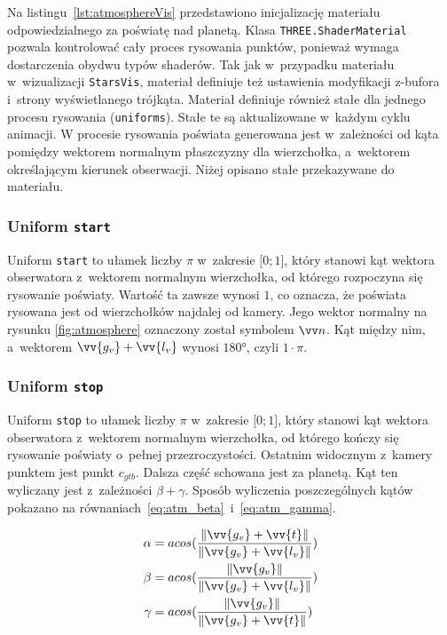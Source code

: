 Na listingu~\ref{lst:atmosphereVis} przedstawiono inicjalizację materiału odpowiedzialnego za poświatę nad planetą. Klasa \texttt{THREE.ShaderMaterial} pozwala kontrolować cały proces rysowania punktów, ponieważ wymaga dostarczenia obydwu typów shaderów. Tak jak w~przypadku materiału w~wizualizacji \texttt{StarsVis}, materiał definiuje też ustawienia modyfikacji z-bufora i~strony wyświetlanego trójkąta. Materiał definiuje również stałe dla jednego procesu rysowania (\texttt{uniforms}). Stałe te są aktualizowane w~każdym cyklu animacji. 
W procesie rysowania poświata generowana jest w~zależności od kąta pomiędzy wektorem normalnym płaszczyzny dla wierzchołka, a~wektorem określającym kierunek obserwacji. Niżej opisano stałe przekazywane do materiału.

\subsubsection{Uniform \texttt{start}}
Uniform \texttt{start} to ułamek liczby $\pi$ w~zakresie $\lbrack0; 1\rbrack$, który stanowi kąt wektora obserwatora z~wektorem normalnym wierzchołka, od którego rozpoczyna się rysowanie poświaty. Wartość ta zawsze wynosi $1$, co oznacza, że poświata rysowana jest od wierzchołków najdalej od kamery. Jego wektor normalny na rysunku \ref{fig:atmosphere} oznaczony został symbolem $\vv n$. Kąt między nim, a~wektorem $\vv{g_v} + \vv{l_v}$ wynosi $\ang{180}$, czyli $1 \cdot \pi$.

\subsubsection{Uniform \texttt{stop}}
Uniform \texttt{stop} to ułamek liczby $\pi$ w~zakresie $\lbrack0; 1\rbrack$, który stanowi kąt wektora obserwatora z~wektorem normalnym wierzchołka, od którego kończy się rysowanie poświaty o~pełnej przezroczystości. Ostatnim widocznym z~kamery punktem jest punkt $c_{gtb}$. Dalsza część schowana jest za planetą. Kąt ten wyliczany jest z~zależności $\beta+\gamma$. Sposób wyliczenia poszczególnych kątów pokazano na równaniach~\ref{eq:atm_beta}~i~\ref{eq:atm_gamma}.

\begin{align}
  \label{eq:atm_alfa}
  \alpha &= acos(\frac{\length{\vv{g_v}+\vv{t}}}{\length{\vv{g_v}+\vv{l_v}}}) \\
  \label{eq:atm_beta}
  \beta &= acos(\frac{\length{\vv{g_v}}}{\length{\vv{g_v}+\vv{l_v}}}) \\
  \label{eq:atm_gamma}
  \gamma &= acos(\frac{\length{\vv{g_v}}}{\length{\vv{g_v}+\vv{t}}})
\end{align}


